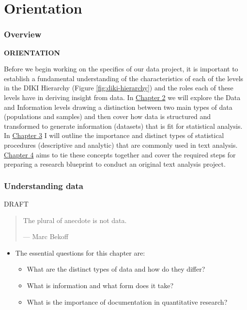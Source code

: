\documentclass[
]{article}
\providecommand{\tightlist}{%
  \setlength{\itemsep}{0pt}\setlength{\parskip}{0pt}}
\newenvironment{rmdblock}[1]
  {\begin{shaded*}
  \begin{itemize}
  \renewcommand{\labelitemi}{
    \raisebox{-.5\height}[0pt][0pt]{
      {\setkeys{Gin}{width=2em,keepaspectratio}\texttt{[image: assets/images/\#1]}}
    }
  }
  \item
  }
  {
  \end{itemize}
  \end{shaded*}
  }
\newenvironment{rmdkey}
  {\begin{rmdblock}{key}}
  {\end{rmdblock}}
\begin{document}
\hypertarget{part-orientation}{%
\part{Orientation}\label{part-orientation}}

\hypertarget{orientation-overview}{%
\section*{Overview}\label{orientation-overview}}

\textbf{ORIENTATION}

Before we begin working on the specifics of our data project, it is important to establish a fundamental understanding of the characteristics of each of the levels in the DIKI Hierarchy (Figure \ref{fig:diki-hierarchy}) and the roles each of these levels have in deriving insight from data. In \protect\hyperlink{understanding-data}{Chapter 2} we will explore the Data and Information levels drawing a distinction between two main types of data (populations and samples) and then cover how data is structured and transformed to generate information (datasets) that is fit for statistical analysis. In \protect\hyperlink{approaching-analysis}{Chapter 3} I will outline the importance and distinct types of statistical procedures (descriptive and analytic) that are commonly used in text analysis. \protect\hyperlink{framing-research}{Chapter 4} aims to tie these concepts together and cover the required steps for preparing a research blueprint to conduct an original text analysis project.

\hypertarget{understanding-data}{%
\section{Understanding data}\label{understanding-data}}

DRAFT

\begin{quote}
The plural of anecdote is not data.

--- Marc Bekoff
\end{quote}

\begin{rmdkey}
The essential questions for this chapter are:

\begin{itemize}
\tightlist
\item
  What are the distinct types of data and how do they differ?
\item
  What is information and what form does it take?
\item
  What is the importance of documentation in quantitative research?
\end{itemize}
\end{rmdkey}
\end{document}
